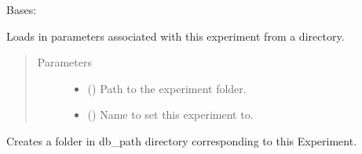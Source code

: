 \documentclass[letterpaper,10pt,english]{sphinxmanual}
\begin{document}

\begin{fulllineitems}
\label{\detokenize{Fireworks:Fireworks.extensions.experiment.Experiment}}
Bases: 

\begin{fulllineitems}
\label{\detokenize{Fireworks:Fireworks.extensions.experiment.Experiment.load_experiment}}
Loads in parameters associated with this experiment from a directory.
\begin{quote}\begin{description}
\item[{Parameters}] \leavevmode\begin{itemize}
\item {} 
 () \textendash{} Path to the experiment folder.

\item {} 
 () \textendash{} Name to set this experiment to.

\end{itemize}

\end{description}\end{quote}

\end{fulllineitems}


\begin{fulllineitems}
\label{\detokenize{Fireworks:Fireworks.extensions.experiment.Experiment.create_dir}}
Creates a folder in db\_path directory corresponding to this Experiment.


\end{fulllineitems}
\end{fulllineitems}
\end{document}
